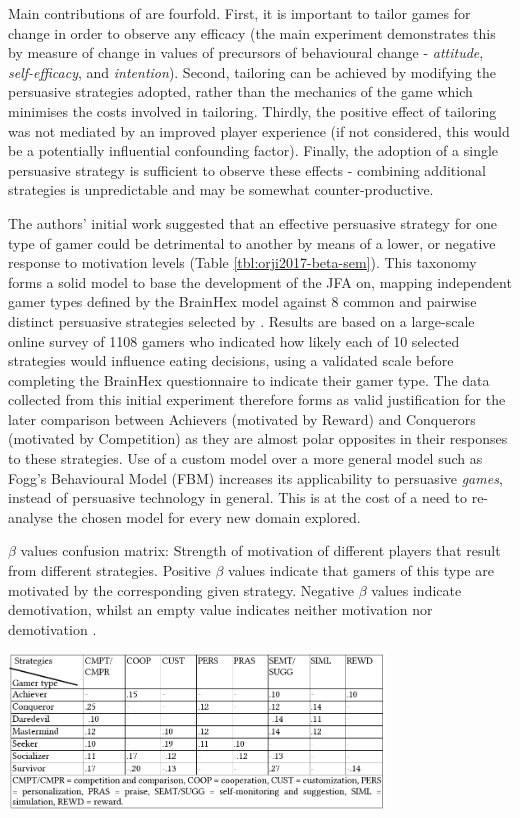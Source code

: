 \documentclass[11pt]{article}
\begin{document}
Main contributions of \citet{orji2017} are fourfold. First, it is important to tailor games for change in order to observe any efficacy (the main experiment demonstrates this by measure of change in values of precursors of behavioural change - \textit{attitude}, \textit{self-efficacy}, and \textit{intention}). Second, tailoring can be achieved by modifying the persuasive strategies adopted, rather than the mechanics of the game which minimises the costs involved in tailoring. Thirdly, the positive effect of tailoring was not mediated by an improved player experience (if not considered, this would be a potentially influential confounding factor). Finally, the adoption of a single persuasive strategy is sufficient to observe these effects - combining additional strategies is unpredictable and may be somewhat counter-productive.

The authors' initial work suggested that an effective persuasive strategy for one type of gamer could be detrimental to another by means of a lower, or negative response to motivation levels \citep{orji2013a} (Table \ref{tbl:orji2017-beta-sem}). This taxonomy forms a solid model to base the development of the JFA on, mapping independent gamer types defined by the BrainHex model \citep{nacke2014} against 8 common and pairwise distinct persuasive strategies selected by \citet{gerling2014}. Results are based on a large-scale online survey of 1108 gamers who indicated how likely each of 10 selected strategies would influence eating decisions, using a validated scale \citep{drozd2012} before completing the BrainHex questionnaire to indicate their gamer type. The data collected from this initial experiment therefore forms as valid justification for the later comparison between Achievers (motivated by Reward) and Conquerors (motivated by Competition) as they are almost polar opposites in their responses to these strategies. Use of a custom model over a more general model such as Fogg's Behavioural Model (FBM) \citep{fogg2002} increases its applicability to persuasive \textit{games}, instead of persuasive technology in general. This is at the cost of a need to re-analyse the chosen model for every new domain explored.

\begin{table}[H]
\centering
\caption{$\beta$ values confusion matrix: Strength of motivation of different players that result from different strategies. Positive $\beta$ values indicate that gamers of this type are motivated by the corresponding given strategy. Negative $\beta$ values indicate demotivation, whilst an empty value indicates neither motivation nor demotivation \protect\citep{orji2013a}.
}\label{tbl:orji2017-beta-sem}
\includegraphics[width=0.75\textwidth]{img/orji2017-beta-sem.png} 
\end{table}
\end{document}
